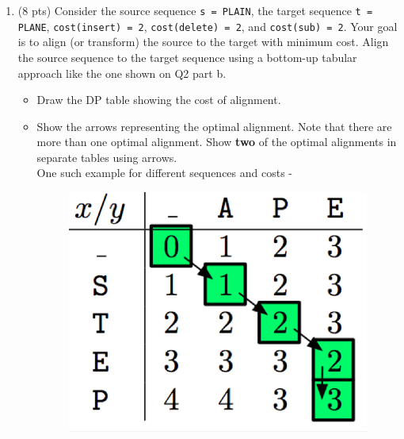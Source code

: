 \documentclass[12pt]{article}
\theoremstyle{remark}
\newtheorem*{solution}{Solution}
\begin{document}
\begin{enumerate}
\begin{enumerate}
\begin{solution}
    B  E  A  R  \_\\
    $:\enspace\vert\enspace:\enspace\enspace:\thinspace\vert$  \\
    B  \_  A  R  E\\
    \end{solution}
    
    \pagebreak
    \item (8 pts) Consider the source sequence \texttt{s = PLAIN}, the target sequence \texttt{t = PLANE}, \texttt{cost(insert) = 2}, \texttt{cost(delete) = 2}, and \texttt{cost(sub) = 2}. Your goal is to align (or transform) the source to the target with minimum cost. Align the source sequence to the target sequence using a bottom-up tabular approach like the one shown on Q2 part b.
    \begin{itemize}
        \item Draw the DP table showing the cost of alignment.
        \item Show the arrows representing the optimal alignment. Note that there are more than one optimal alignment. Show \textbf{two} of the optimal alignments in separate tables using arrows. 
        \\One such example for different sequences and costs - 
        
            \begin{figure}[h!]
            \begin{center}
            \includegraphics[scale=0.3]{Example.jpeg}
            \end{center}
            \end{figure}
        

\end{itemize}
\end{enumerate}
\end{enumerate}
\end{document}
